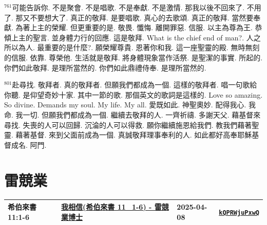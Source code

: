 \documentclass{book}
\begin{document}
$^{761}$可能告訴你.
不是聚會.
不是唱歌.
不是奉獻.
不是激情.
那我以後不回來了.
不用了.
那又不要想大了.
真正的敬拜.
是要唱歌.
真心的去歌頌.
真正的敬拜.
當然要奉獻.
為著上主的榮耀.
但更重要的是.
敬畏.
懺悔.
離開罪惡.
信服.
以主為尊為王.
恭傾上主的聖言.
並身體力行的回應.
這是敬拜.
What is the chief end of man?.
人之所以為人.
最重要的是什麼?.
願榮耀尊貴.
恩著你和我.
這一座聖靈的殿.
無時無刻的信服.
依靠.
尊榮他.
生活就是敬拜.
將身體現象當作活祭.
是聖潔的事實.
所起的.
你們如此敬拜.
是理所當然的.
你們如此鼎禮侍奉.
是理所當然的.

$^{801}$赴尋找.
敬拜者.
真的敬拜者.
但願我們都成為一個.
這樣的敬拜者.
唱一句歌給你聽.
是仰望奇妙十家.
其中一節的歌.
那個英文的歌詞是這樣的.
Love so amazing.
So divine.
Demands my soul.
My life.
My all.
愛既如此.
神聖奧妙.
配得我心.
我命.
我一切.
但願我們都成為一個.
繼續去敬拜的人.
一齊祈禱.
多謝天父.
藉基督來尋找.
失喪的人可以回歸.
沉淪的人可以得救.
願你繼續施恩給我們.
教我們藉著聖靈.
藉著基督.
來到父面前成為一個.
真誠敬拜理事奉利的人.
如此都好高奉耶穌基督成名.
阿門.
\newpage



\chapter{雷競業}\label{ch:preacher16}
\begin{multicols}{3}
\minitoc
\end{multicols}
{ \scriptsize


\begin{xltabular}{\textwidth}{|p{0.15\textwidth} p{0.6\textwidth}|p{0.07\textwidth} p{0.1\textwidth}|}
\hline
希伯來書 11:1-6 & \hyperref[sec:kQPRWjuPxwQ]{我相信(希伯來書 11\_1-6) - 雷競業博士} & 2025-04-08 & \href{https://youtube.com/watch?v=kQPRWjuPxwQ}{\texttt{kQPRWjuPxwQ}} \\
\hline
\end{xltabular}
}
\newpage
\end{document}
